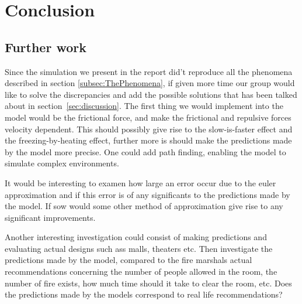 \section{Conclusion}
\label{sec:conclusion}

\subsection{Further work}
Since the simulation we present in the report did't reproduce all the phenomena described in
section \ref{subsec:ThePhenomena}, if given more time our group would like to solve the discrepancies and add the possible solutions that has been talked about in section~\ref{sec:discussion}. The first thing we would implement into the model would be the frictional force, and make the frictional and repulsive forces velocity dependent. This should possibly give rise to the slow-is-faster effect and the freezing-by-heating effect, further more is should make the predictions made by the model more precise.
One could add path finding, enabling the model to simulate complex environments.

It would be interesting to examen how large an error occur due to the euler approximation and if this error is of any significants to the predictions made by the model. If sow would some other method of approximation give rise to any significant improvements.

Another interesting investigation could consist of making predictions and evaluating actual designs such ass malls, theaters etc. Then investigate the predictions made by the model, compared to the fire marshals actual recommendations concerning the number of people allowed in the room, the number of fire exists, how much time should it take to clear the room, etc. Does the predictions made by the models correspond to real life recommendations?